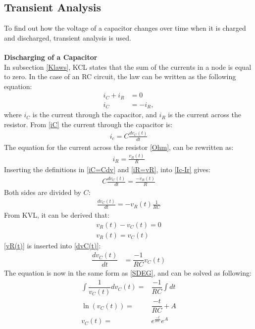 \subsection{Transient Analysis}
\label{sec371}
To find out how the voltage of a capacitor changes over time when it is charged and discharged, transient analysis is used.
\\
\\
\textbf{Discharging of a Capacitor}\\
In subsection \ref{Klaws}, KCL states that the sum of the currents in a node is equal to zero. In the case of an RC circuit, the law can be written as the following equation:
\begin{align}
i_{C}+i_{R}&=0 \nonumber \\
i_{C}&= -i_{R}, \label{Ic-Ir}
\end{align}
where $i_C$ is the current through the capacitor, and $i_R$ is the current across the resistor. From \eqref{iC} the current through the capacitor is:
\begin{align}
	i_c = C\frac{dv_C(t)}{dt}\label{iC=Cdv}
\end{align}
The equation for the current across the resistor \eqref{Ohm}, can be rewritten as:
\begin{align}
	i_R = \frac{v_R(t)}{R}\label{iR=vR}
\end{align}
Inserting the definitions in \eqref{iC=Cdv} and \eqref{iR=vR}, into \eqref{Ic-Ir} gives:
\begin{align*}
	C\frac{dv_C(t)}{dt} = \frac{-v_R(t)}{R}
\end{align*}
Both sides are divided by $C$:
\begin{align}
	\frac{dv_C(t)}{dt} =-v_R(t) \frac{1}{RC}
	\label{eq:dvC(t)}
\end{align}
From KVL, it can be derived that:
\begin{align}
	v_R(t) - v_C(t) = 0\nonumber\\
	v_R(t) = v_C(t) \label{vR(t)}
\end{align}
\eqref{vR(t)} is inserted into \eqref{dvC(t)}:
\begin{align*}
	\dfrac{dv_C(t)}{dt} &= \dfrac{-1}{RC}v_C(t)
\end{align*}
The equation is now in the same form as \eqref{SDEG}, and can be solved as following:
\begin{align}
\int \dfrac{1}{v_C(t)}dv_C(t) =& \dfrac{-1}{RC} \int dt\nonumber \\
\ln(v_C(t)) =& \dfrac{-t}{RC} + A \nonumber\\
v_C(t) =& e^{\frac{-t}{RC}}e^{A}\label{V_eA}
\end{align}
